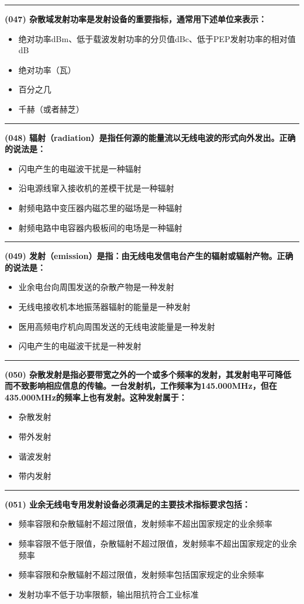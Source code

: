 \documentclass[twocolumn]{ctexart}  %
\begin{document}
\noindent\rule{0.5\textwidth}{1pt}
\heiti \textbf{(047) 杂散域发射功率是发射设备的重要指标，通常用下述单位来表示：} \songti {\color{gray} [LK0118] }
\begin{itemize}
	\item  绝对功率dBm、低于载波发射功率的分贝值dBc、低于PEP发射功率的相对值dB
	\item  绝对功率（瓦）
	\item  百分之几
	\item  千赫（或者赫芝）
\end{itemize}


\noindent\rule{0.5\textwidth}{1pt}
\heiti \textbf{(048) 辐射（radiation）是指任何源的能量流以无线电波的形式向外发出。正确的说法是：} \songti {\color{gray} [LK0125] }
\begin{itemize}
	\item  闪电产生的电磁波干扰是一种辐射
	\item  沿电源线窜入接收机的差模干扰是一种辐射
	\item  射频电路中变压器内磁芯里的磁场是一种辐射
	\item  射频电路中电容器内极板间的电场是一种辐射
\end{itemize}


\noindent\rule{0.5\textwidth}{1pt}
\heiti \textbf{(049) 发射（emission）是指：由无线电发信电台产生的辐射或辐射产物。正确的说法是：} \songti {\color{gray} [LK0126] }
\begin{itemize}
	\item  业余电台向周围发送的杂散产物是一种发射
	\item  无线电接收机本地振荡器辐射的能量是一种发射
	\item  医用高频电疗机向周围发送的无线电波能量是一种发射
	\item  闪电产生的电磁波干扰是一种发射
\end{itemize}


\noindent\rule{0.5\textwidth}{1pt}
\heiti \textbf{(050) 杂散发射是指必要带宽之外的一个或多个频率的发射，其发射电平可降低而不致影响相应信息的传输。一台发射机，工作频率为145.000MHz，但在435.000MHz的频率上也有发射。这种发射属于：} \songti {\color{gray} [LK0137] }
\begin{itemize}
	\item  杂散发射
	\item  带外发射
	\item  谐波发射
	\item  带内发射
\end{itemize}


\noindent\rule{0.5\textwidth}{1pt}
\heiti \textbf{(051) 业余无线电专用发射设备必须满足的主要技术指标要求包括：} \songti {\color{gray} [LK0139] }
\begin{itemize}
	\item  频率容限和杂散辐射不超过限值，发射频率不超出国家规定的业余频率
	\item  频率容限不低于限值，杂散辐射不超过限值，发射频率不超出国家规定的业余频率
	\item  频率容限和杂散辐射不超过限值，发射频率包括国家规定的业余频率
	\item  发射功率不低于功率限额，输出阻抗符合工业标准
\end{itemize}
\end{document}
